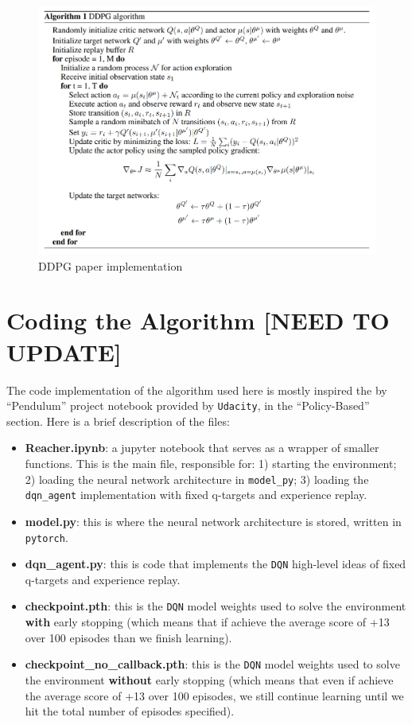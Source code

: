 \documentclass[
]{article}
\begin{document}
\begin{figure}
\centering
\includegraphics{imgs/ddpg_print_1.png}
\caption{DDPG paper implementation}
\end{figure}

\pagebreak

\hypertarget{coding-the-algorithm-need-to-update}{%
\section{Coding the Algorithm {[}NEED TO
UPDATE{]}}\label{coding-the-algorithm-need-to-update}}

The code implementation of the algorithm used here is mostly inspired
the by ``Pendulum'' project notebook provided by \texttt{Udacity}, in
the ``Policy-Based'' section. Here is a brief description of the files:

\begin{itemize}
\item
  \textbf{Reacher.ipynb}: a jupyter notebook that serves as a wrapper of
  smaller functions. This is the main file, responsible for: 1) starting
  the environment; 2) loading the neural network architecture in
  \texttt{model\_py}; 3) loading the \texttt{dqn\_agent} implementation
  with fixed q-targets and experience replay.
\item
  \textbf{model.py}: this is where the neural network architecture is
  stored, written in \texttt{pytorch}.
\item
  \textbf{dqn\_agent.py}: this is code that implements the \texttt{DQN}
  high-level ideas of fixed q-targets and experience replay.
\item
  \textbf{checkpoint.pth}: this is the \texttt{DQN} model weights used
  to solve the environment \textbf{with} early stopping (which means
  that if achieve the average score of +13 over 100 episodes than we
  finish learning).
\item
  \textbf{checkpoint\_no\_callback.pth}: this is the \texttt{DQN} model
  weights used to solve the environment \textbf{without} early stopping
  (which means that even if achieve the average score of +13 over 100
  episodes, we still continue learning until we hit the total number of
  episodes specified).
\end{itemize}
\end{document}
